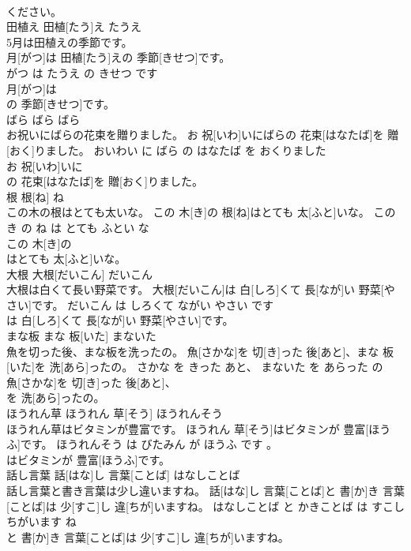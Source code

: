 \documentclass[8pt]{extreport}
\begin{document}
\begin{CJK}{UTF8}{min}
\\	ください。			
\\	田植え	田植[たう]え	たうえ	
\\	5月は田植えの季節です。	
\\	月[がつ]は 田植[たう]えの 季節[きせつ]です。	
\\	がつ は たうえ の きせつ です	
\\	月[がつ]は
\\	の 季節[きせつ]です。			
\\	ばら	ばら	ばら	
\\	お祝いにばらの花束を贈りました。	お 祝[いわ]いにばらの 花束[はなたば]を 贈[おく]りました。	おいわい に ばら の はなたば を おくりました	
\\	お 祝[いわ]いに
\\	の 花束[はなたば]を 贈[おく]りました。			
\\	根	根[ね]	ね	
\\	この木の根はとても太いな。	この 木[き]の 根[ね]はとても 太[ふと]いな。	この き の ね は とても ふとい な	
\\	この 木[き]の
\\	はとても 太[ふと]いな。			
\\	大根	大根[だいこん]	だいこん	
\\	大根は白くて長い野菜です。	大根[だいこん]は 白[しろ]くて 長[なが]い 野菜[やさい]です。	だいこん は しろくて ながい やさい です	
\\	は 白[しろ]くて 長[なが]い 野菜[やさい]です。			
\\	まな板	まな 板[いた]	まないた	
\\	魚を切った後、まな板を洗ったの。	魚[さかな]を 切[き]った 後[あと]、まな 板[いた]を 洗[あら]ったの。	さかな を きった あと、 まないた を あらった の	
\\	魚[さかな]を 切[き]った 後[あと]、
\\	を 洗[あら]ったの。			
\\	ほうれん草	ほうれん 草[そう]	ほうれんそう	
\\	ほうれん草はビタミンが豊富です。	ほうれん 草[そう]はビタミンが 豊富[ほうふ]です。	ほうれんそう は びたみん が ほうふ です 。	
\\	はビタミンが 豊富[ほうふ]です。			
\\	話し言葉	話[はな]し 言葉[ことば]	はなしことば	
\\	話し言葉と書き言葉は少し違いますね。	話[はな]し 言葉[ことば]と 書[か]き 言葉[ことば]は 少[すこ]し 違[ちが]いますね。	はなしことば と かきことば は すこし ちがいます ね	
\\	と 書[か]き 言葉[ことば]は 少[すこ]し 違[ちが]いますね。			

\end{CJK}
\end{document}
